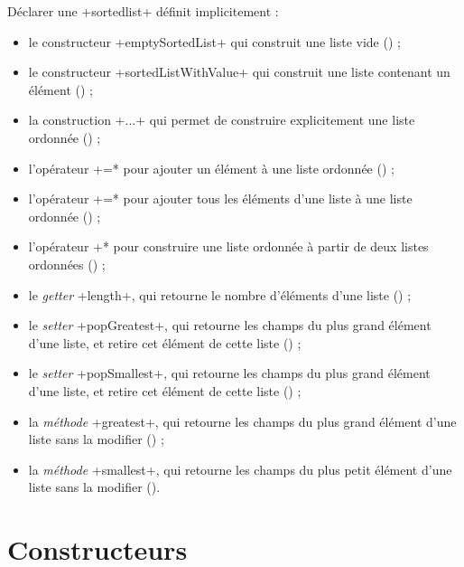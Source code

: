 Déclarer une \ggs+sortedlist+ définit implicitement :
\begin{itemize}
  \item le constructeur \ggs+emptySortedList+ qui construit une liste vide () ;
  \item le constructeur \ggs+sortedListWithValue+ qui construit une liste contenant un élément () ;
  \item la construction \ggs+{...}+ qui permet de construire explicitement une liste ordonnée () ;
  \item l'opérateur \ggs*+=* pour ajouter un élément à une liste ordonnée () ;
  \item l'opérateur \ggs*+=* pour ajouter tous les éléments d'une liste à une liste ordonnée () ;
  \item l'opérateur \ggs*+* pour construire une liste ordonnée à partir de deux listes ordonnées () ;
  \item le \emph{getter} \ggs+length+, qui retourne le nombre d'éléments d'une liste () ;
  \item le \emph{setter} \ggs+popGreatest+, qui retourne les champs du plus grand élément d'une liste, et retire cet élément de cette liste () ;
  \item le \emph{setter} \ggs+popSmallest+, qui retourne les champs du plus grand élément d'une liste, et retire cet élément de cette liste () ;
  \item la \emph{méthode} \ggs+greatest+, qui retourne les champs du plus grand élément d'une liste sans la modifier () ;
  \item la \emph{méthode} \ggs+smallest+, qui retourne les champs du plus petit élément d'une liste sans la modifier ().
\end{itemize}








\section{Constructeurs}

